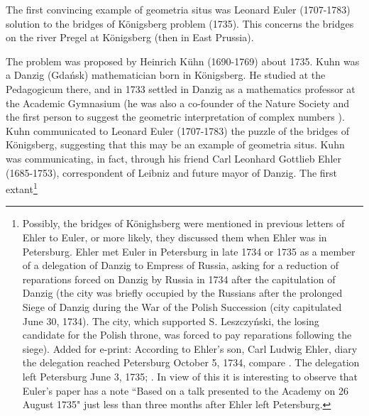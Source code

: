 \documentclass[12pt]{amsart}
\begin{document}
The first convincing example
of geometria situs was Leonard Euler (1707-1783) solution to the bridges of K\"onigsberg
problem (1735).
 This concerns the bridges on the river Pregel
at K\"onigsberg (then in East Prussia).

The problem was proposed by Heinrich K\"uhn (1690-1769) about 1735.
 Kuhn was a Danzig (Gda\'nsk) mathematician
 born in K\"onigsberg. He studied at the Pedagogicum there,
and in 1733 settled in Danzig as a mathematics professor at the Academic Gymnasium (he was also
a co-founder of the Nature Society and  the first person to suggest the geometric interpretation of complex
numbers \cite{Jan,Kuhn,Sz1,Sz2}). Kuhn communicated to Leonard Euler (1707-1783)
the puzzle of the bridges of K\"onigsberg, suggesting that this may
be an example of geometria situs. Kuhn was communicating,
in fact, through his friend Carl Leonhard Gottlieb Ehler (1685-1753), correspondent of Leibniz and
future mayor of Danzig.
The first extant\footnote{Possibly, the bridges of K\"onighsberg were mentioned in previous letters
of Ehler to Euler, or more likely, they discussed them when Ehler was in Petersburg.
Ehler met Euler in Petersburg in late 1734 or 1735 as a member of a delegation of Danzig to Empress of Russia,
asking for a reduction of reparations forced on Danzig by Russia in 1734 after the capitulation of Danzig
(the city was briefly occupied by the Russians after the prolonged Siege of Danzig during
the War of the Polish Succession (city capitulated June 30, 1734).
The city, which supported S. Leszczy\'nski, the losing candidate for
the Polish throne, was forced to pay reparations following the siege). {\color{red} Added for e-print: According to Ehler's son, Carl Ludwig Ehler, diary the delegation reached Petersburg October 5, 1734, compare \cite{Sz1}. } The delegation left Petersburg June 3, 1735;
\cite{Czer}. In view of this it is interesting to observe that Euler's paper has a note ``Based on a
talk presented to the Academy on 26 August 1735" just less than three months after Ehler left Petersburg. }
\end{document}
